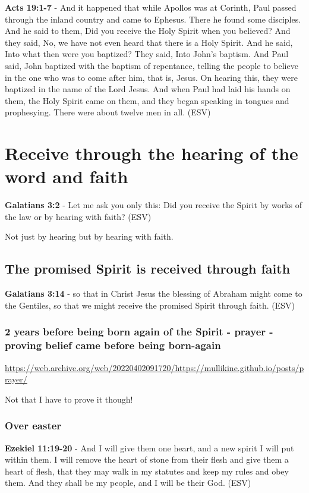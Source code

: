 \documentclass[11pt]{article}
\begin{document}
\textbf{Acts 19:1-7} - And it happened that while Apollos was at Corinth, Paul passed through the inland country and came to Ephesus.  There he found some disciples.  And he said to them, Did you receive the Holy Spirit when you believed?  And they said, No, we have not even heard that there is a Holy Spirit.  And he said, Into what then were you baptized?  They said, Into John's baptism.  And Paul said, John baptized with the baptism of repentance, telling the people to believe in the one who was to come after him, that is, Jesus. On hearing this, they were baptized in the name of the Lord Jesus. And when Paul had laid his hands on them, the Holy Spirit came on them, and they began speaking in tongues and prophesying. There were about twelve men in all.  (ESV)

\section{Receive through the hearing of the word and faith}
\label{sec:orgc60cf63}
\textbf{Galatians 3:2} - Let me ask you only this: Did you receive the Spirit by works of the law or by hearing with faith? (ESV)

Not just by hearing but by hearing with faith.

\subsection{The promised Spirit is received through faith}
\label{sec:orge4b3bbe}
\textbf{Galatians 3:14} - so that in Christ Jesus the blessing of Abraham might come to the Gentiles, so that we might receive the promised Spirit through faith.  (ESV)

\subsubsection{2 years before being born again of the Spirit - prayer - proving belief came before being born-again}
\label{sec:org4be5837}
\url{https://web.archive.org/web/20220402091720/https://mullikine.github.io/posts/prayer/}

Not that I have to prove it though!

\subsubsection{Over easter}
\label{sec:orge093dc5}
\textbf{Ezekiel 11:19-20} - And I will give them one heart, and a new spirit I will put within them. I will remove the heart of stone from their flesh and give them a heart of flesh, that they may walk in my statutes and keep my rules and obey them. And they shall be my people, and I will be their God. (ESV)
\end{document}
